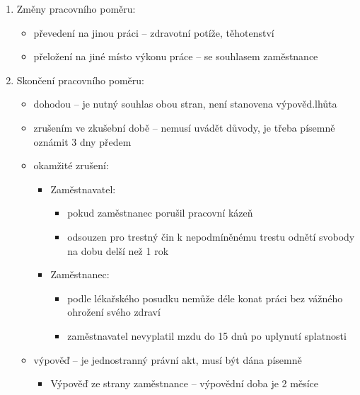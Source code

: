\begin{enumerate}
\begin{enumerate}
\begin{itemize}
                \end{itemize}
            \item Změny pracovního poměru:
                \begin{itemize}
                    \item převedení na jinou práci -- zdravotní potíže, těhotenství
                    \item přeložení na jiné místo výkonu práce -- se souhlasem zaměstnance
                \end{itemize}
            \item Skončení pracovního poměru:
                \begin{itemize}
                    \item dohodou -- je nutný souhlas obou stran, není stanovena výpověd.lhůta
                    \item zrušením ve zkušební době -- nemusí uvádět důvody, je třeba písemně oznámit 3 dny předem
                    \item okamžité zrušení:
                        \begin{itemize}
                            \item Zaměstnavatel:
                                \begin{itemize}
                                    \item pokud zaměstnanec porušil pracovní kázeň
                                    \item odsouzen pro trestný čin k nepodmíněnému trestu odnětí svobody na dobu delší než 1 rok
                                \end{itemize}
                            \item Zaměstnanec:
                                \begin{itemize}
                                    \item podle lékařského posudku nemůže déle konat práci bez vážného ohrožení svého zdraví
                                    \item zaměstnavatel nevyplatil mzdu do 15 dnů po uplynutí splatnosti
                                \end{itemize}
                        \end{itemize}
                    \item výpověď -- je jednostranný právní akt, musí být dána písemně
                        \begin{itemize}
                            \item Výpověď ze strany zaměstnance -- výpovědní doba je 2 měsíce

\end{itemize}
\end{itemize}
\end{enumerate}
\end{enumerate}
